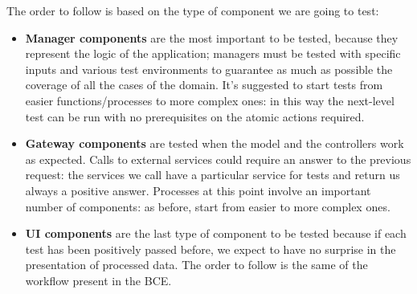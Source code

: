 The order to follow is based on the type of component we are going to test:
\begin{itemize}
\item \textbf{Manager components} are the most important to be tested, because they represent the logic of the application; managers must be tested with specific inputs and various test environments to guarantee as much as possible the coverage of all the cases of the domain. It’s suggested to start tests from easier functions/processes to more complex ones: in this way the next-level test can be run with no prerequisites on the atomic actions required.
\item \textbf{Gateway components} are tested when the model and the controllers work as expected. Calls to external services could require an answer to the previous request: the services we call have a particular service for tests and return us always a positive answer. Processes at this point involve an important number of components: as before, start from easier to more complex ones.
\item \textbf{UI components} are the last type of component to be tested because if each test has been positively passed before, we expect to have no surprise in the presentation of processed data. The order to follow is the same of the workflow present in the BCE.

\end{itemize}




